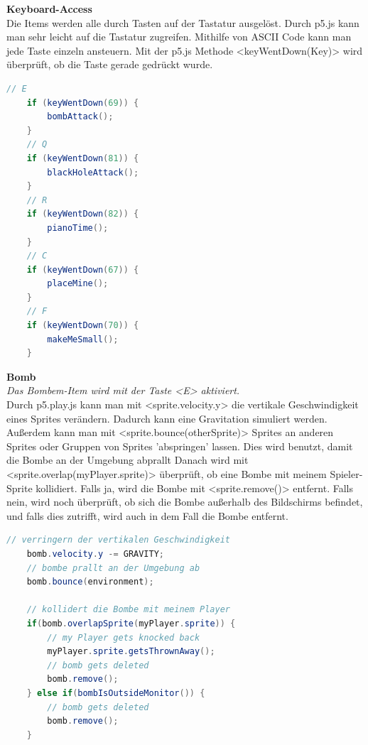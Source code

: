 \textbf{Keyboard-Access}
\\
Die Items werden alle durch Tasten auf der Tastatur ausgelöst. Durch p5.js kann man sehr leicht auf die Tastatur zugreifen. Mithilfe von ASCII Code kann man jede Taste einzeln ansteuern.
Mit der p5.js Methode <keyWentDown(Key)> wird überprüft, ob die Taste gerade gedrückt wurde.

\begin{lstlisting}[caption=Keyboard-Access,language=Java,label=lst:impl:keyboard-access]
    // E
    if (keyWentDown(69)) {
        bombAttack();
    }
    // Q
    if (keyWentDown(81)) {
        blackHoleAttack();
    }
    // R
    if (keyWentDown(82)) {
        pianoTime();
    }
    // C
    if (keyWentDown(67)) {
        placeMine();
    }
    // F
    if (keyWentDown(70)) {
        makeMeSmall();
    }
\end{lstlisting}

\textbf{Bomb}
\\
\textit{Das Bombem-Item wird mit der Taste <E> aktiviert.}
\\
Durch p5.play.js kann man mit <sprite.velocity.y> die vertikale Geschwindigkeit eines Sprites verändern. Dadurch kann eine Gravitation simuliert werden.
Außerdem kann man mit <sprite.bounce(otherSprite)> Sprites an anderen Sprites oder Gruppen von Sprites 'abspringen' lassen. Dies wird benutzt, damit die Bombe an der Umgebung abprallt
Danach wird mit <sprite.overlap(myPlayer.sprite)> überprüft, ob eine Bombe mit meinem Spieler-Sprite kollidiert.
Falls ja, wird die Bombe mit <sprite.remove()> entfernt.
Falls nein, wird noch überprüft, ob sich die Bombe außerhalb des Bildschirms befindet, und falls dies zutrifft, wird auch in dem Fall die Bombe entfernt.
\\

\begin{lstlisting}[caption=Bomb Item Physics,language=Java,label=lst:impl:bombGravity]
    // verringern der vertikalen Geschwindigkeit 
    bomb.velocity.y -= GRAVITY;
    // bombe prallt an der Umgebung ab
    bomb.bounce(environment);

    // kollidert die Bombe mit meinem Player
    if(bomb.overlapSprite(myPlayer.sprite)) {
        // my Player gets knocked back
        myPlayer.sprite.getsThrownAway();
        // bomb gets deleted
        bomb.remove();
    } else if(bombIsOutsideMonitor()) {
        // bomb gets deleted
        bomb.remove();
    }

\end{lstlisting}

